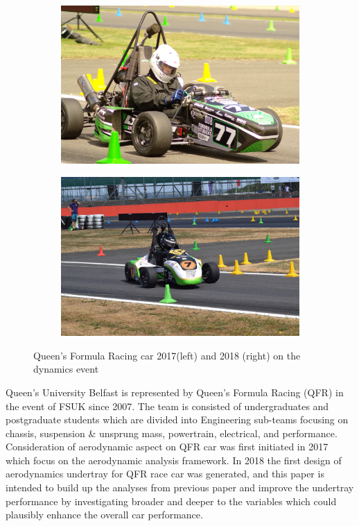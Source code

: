\begin{figure}[!ht]
\begin{center}
%    
  \begin{subfigure}[b]{0.4\textwidth}
    \includegraphics[scale=0.05]{Figures/QFR17PHOTO.JPG}
  \end{subfigure}
  \begin{subfigure}[b]{0.4\textwidth}
    \includegraphics[scale=0.05]{Figures/QFR18PHOTO.jpg}
  \end{subfigure}
%  
  \caption{Queen's Formula Racing car 2017(left) and 2018 (right) on the dynamics event}
    \label{fig:1}
\end{center}
\end{figure}


\noindent Queen's University Belfast is represented by Queen's Formula Racing (QFR) in the event of FSUK since 2007. The team is consisted of undergraduates and postgraduate students which are divided into Engineering sub-teams focusing on chassis, suspension \& unsprung mass, powertrain, electrical, and performance. Consideration of aerodynamic aspect on QFR car was first initiated in 2017 which focus on the aerodynamic analysis framework\cite{Corr2017MechanicalAuthor}. In 2018 the first design of aerodynamics undertray for QFR race car was generated\cite{McKeown2018DesignCar}, and this paper is intended to build up the analyses from previous paper and improve the undertray performance by investigating broader and deeper to the variables which could plausibly enhance the overall car performance.  

